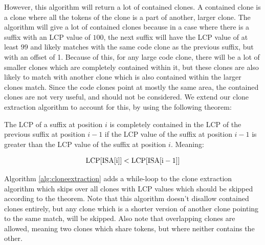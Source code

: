 However, this algorithm will return a lot of contained clones. A contained clone is a
clone where all the tokens of the clone is a part of another, larger clone. The algorithm
will give a lot of contained clones because in a case where there is a suffix with an LCP
value of $100$, the next suffix will have the LCP value of at least $99$ and likely
matches with the same code clone as the previous suffix, but with an offset of 1. Because
of this, for any large code clone, there will be a lot of smaller clones which are
completely contained within it, but these clones are also likely to match with another
clone which is also contained within the larger clones match. Since the code clones point
at mostly the same area, the contained clones are not very useful, and should not be
considered. We extend our clone extraction algorithm to account for this, by using the
following theorem:

\begin{theorem} 

    The LCP of a suffix at position $i$ is completely contained in the LCP of the previous
    suffix at position $i - 1$ if the LCP value of the suffix at position $i - 1$ is
    greater than the LCP value of the suffix at position $i$. Meaning:

    $$
    \mathrm{LCP}[{\mathrm{ISA}[{\mathrm{i}}]}] < \mathrm{LCP}[{\mathrm{ISA}[{\mathrm{i} - 1}]}]
    $$

\end{theorem}


Algorithm \ref{alg:cloneextraction} adds a while-loop to the clone extraction algorithm
which skips over all clones with LCP values which should be skipped according to the
theorem. Note that this algorithm doesn't disallow contained clones entirely, but any
clone which is a shorter version of another clone pointing to the same match, will be
skipped. Also note that overlapping clones are allowed, meaning two clones which share
tokens, but where neither contains the other.

